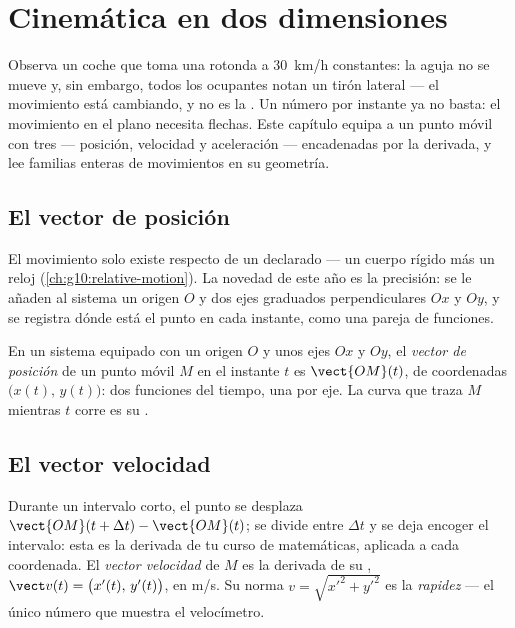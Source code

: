 \chapter{Cinemática en dos dimensiones}\label{ch:g12:kinematics-2d}

Observa un coche que toma una rotonda a \qty{30}{km/h} constantes: la
aguja no se mueve y, sin embargo, todos los ocupantes notan un tirón
lateral --- el movimiento está cambiando, y no es la . Un número
por instante ya no basta: el movimiento en el plano necesita flechas.
Este capítulo equipa a un punto móvil con tres --- posición, velocidad y
aceleración --- encadenadas por la derivada, y lee familias enteras de
movimientos en su geometría.

\section{El vector de posición}

El movimiento solo existe respecto de un  declarado
--- un cuerpo rígido más un reloj (\cref{ch:g10:relative-motion}). La
novedad de este año es la precisión: se le añaden al sistema un origen
$O$ y dos ejes graduados perpendiculares $Ox$ y $Oy$, y se registra
dónde está el punto en cada instante, como una pareja de funciones.

\begin{definition}\label{def:g12:kinematics-2d:position}
En un sistema equipado con un origen $O$ y unos ejes $Ox$ y $Oy$, el
\emph{vector de posición} de un punto móvil
$M$ en el instante $t$ es $\vect{OM}(t)$, de coordenadas
$\bigl(x(t),\, y(t)\bigr)$: dos funciones del tiempo, una por eje. La
curva que traza $M$ mientras $t$ corre es su .
\end{definition}

\section{El vector velocidad}

\begin{definition}\label{def:g12:kinematics-2d:velocity}
Durante un intervalo corto, el punto se desplaza
$\vect{OM}(t+\Delta t) - \vect{OM}(t)$; se divide entre $\Delta t$ y se
deja encoger el intervalo: esta es la derivada de tu curso de
matemáticas, aplicada a cada coordenada. El \emph{vector
velocidad} de $M$ es la derivada de su , $\vect v(t) = \bigl(x'(t),\, y'(t)\bigr)$, en \unit{m/s}. Su
norma $v = \sqrt{x'^2 + y'^2}$ es la \emph{rapidez} ---
el único número que muestra el velocímetro.
\end{definition}

